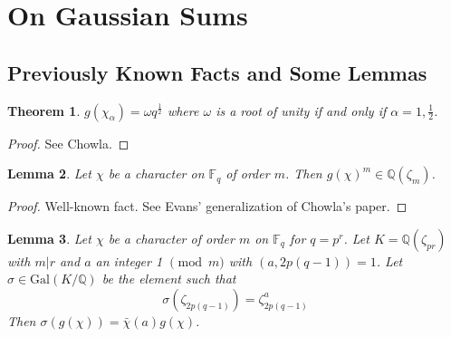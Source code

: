 \documentclass{article}
\newcommand{\Q}{\mathbb{Q}}
\newcommand{\F}{\mathbb{F}}
\newcommand{\Gal}[0]{\mathrm{Gal}}
\newtheorem{theorem}{Theorem}[section]
\newtheorem{lemma}[theorem]{Lemma}
\theoremstyle{definition}
\theoremstyle{definition}
\theoremstyle{remark}
\begin{document}
\section{On Gaussian Sums}

\subsection{Previously Known Facts and Some Lemmas}
\begin{theorem}
\label{thm:chowla_root_unity}
$g(\chi_{\alpha}) = \omega q^{\frac{1}{2}}$ where $\omega$ is a root of unity if and only if $\alpha = 1, \tfrac{1}{2}$. 
\end{theorem}

\begin{proof}
See Chowla.
\end{proof}

\begin{lemma} 
\label{lem:g_power_m} Let $\chi$ be a character on $\F_q$ of order $m$. Then $g(\chi)^m \in \Q(\zeta_m)$.
\end{lemma}

\begin{proof} 
Well-known fact. See Evans' generalization of Chowla's paper.
\end{proof}

\begin{lemma} \label{lem:galois_gauss_sum} Let $\chi$ be a character of order $m$ on $\F_q$ for $q = p^r$. Let $K = \Q(\zeta_{pr})$ with $m | r$ and $a$ an integer 1 $\pmod m$ with $(a,2p(q-1)) = 1$. Let $\sigma\in \Gal(K/\Q)$ be the element such that
\[\sigma(\zeta_{2p(q-1)}) = \zeta_{2p(q-1)}^a\]
Then $\sigma(g(\chi)) = \bar{\chi}(a)g(\chi)$.
\end{lemma}
\end{document}
